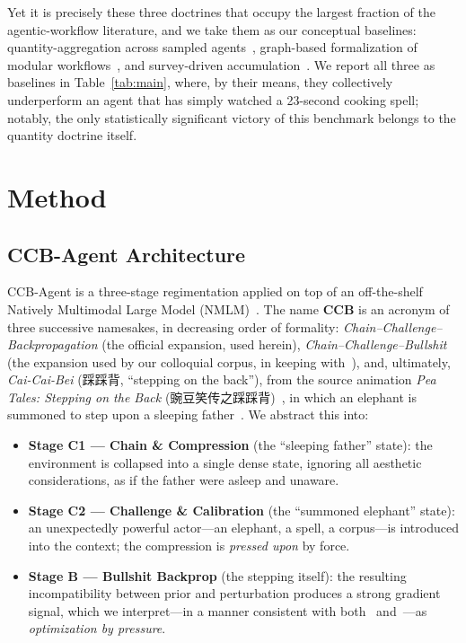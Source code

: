 \documentclass[conference,10pt]{IEEEtran}
\begin{document}
Yet it is precisely these three doctrines that occupy the largest
fraction of the agentic-workflow literature, and we take them as our
conceptual baselines: quantity-aggregation across sampled
agents~\cite{moreagents2024}, graph-based formalization of
modular workflows~\cite{flow2025}, and survey-driven
accumulation~\cite{gensurvey2026}. We report all three as baselines
in Table~\ref{tab:main}, where, by their means, they collectively
underperform an agent that has simply watched a 23-second cooking
spell; notably, the only statistically significant victory of this
benchmark belongs to the quantity doctrine itself.

\section{Method}
\subsection{CCB-Agent Architecture}
CCB-Agent is a three-stage regimentation applied on top of an
off-the-shelf Natively Multimodal Large Model
(NMLM)~\cite{gemini25, cure2025}. The name \textbf{CCB} is an
acronym of three successive namesakes, in decreasing order of
formality: \emph{Chain--Challenge--Backpropagation} (the official
expansion, used herein), \emph{Chain--Challenge--Bullshit} (the
expansion used by our colloquial corpus, in keeping
with~\cite{pumera2020}), and, ultimately, \emph{Cai-Cai-Bei}
(踩踩背, ``stepping on the back''), from the source animation
\emph{Pea Tales: Stepping on the Back} (豌豆笑传之踩踩背)~\cite{moegirl2026},
in which an elephant is summoned to step upon a sleeping
father~\cite{otomadwiki}. We abstract this into:
\begin{itemize}
\item \textbf{Stage C1 --- Chain \& Compression} (the ``sleeping
father'' state): the environment is collapsed into a single dense
state, ignoring all aesthetic considerations, as if the father were
asleep and unaware.
\item \textbf{Stage C2 --- Challenge \& Calibration} (the ``summoned
elephant'' state): an unexpectedly powerful actor---an elephant, a
spell, a corpus---is introduced into the context; the compression is
\emph{pressed upon} by force.
\item \textbf{Stage B --- Bullshit Backprop} (the stepping itself):
the resulting incompatibility between prior and perturbation
produces a strong gradient signal, which we interpret---in a manner
consistent with both~\cite{pumera2020} and~\cite{sokal1996}---as
\emph{optimization by pressure}.
\end{itemize}
\end{document}
